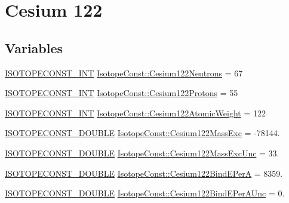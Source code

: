 \hypertarget{group___isotope_const-_cesium-_cs122}{}\section{Cesium 122}
\label{group___isotope_const-_cesium-_cs122}
\subsection*{Variables}
\begin{DoxyCompactItemize}
\item 
\mbox{\hyperlink{group___isotope_const-_macros_ga5f18360b3e99483a35c32d789e62621c}{I\+S\+O\+T\+O\+P\+E\+C\+O\+N\+S\+T\+\_\+\+I\+NT}} \mbox{\hyperlink{group___isotope_const-_cesium-_cs122_ga1a94692414f541522dfc1bc0f874b256}{Isotope\+Const\+::\+Cesium122\+Neutrons}} = 67
\item 
\mbox{\hyperlink{group___isotope_const-_macros_ga5f18360b3e99483a35c32d789e62621c}{I\+S\+O\+T\+O\+P\+E\+C\+O\+N\+S\+T\+\_\+\+I\+NT}} \mbox{\hyperlink{group___isotope_const-_cesium-_cs122_ga236af590a915b595bcb0cf8f0ecc5c2a}{Isotope\+Const\+::\+Cesium122\+Protons}} = 55
\item 
\mbox{\hyperlink{group___isotope_const-_macros_ga5f18360b3e99483a35c32d789e62621c}{I\+S\+O\+T\+O\+P\+E\+C\+O\+N\+S\+T\+\_\+\+I\+NT}} \mbox{\hyperlink{group___isotope_const-_cesium-_cs122_ga1985cb91396288ec78f41336359f64e4}{Isotope\+Const\+::\+Cesium122\+Atomic\+Weight}} = 122
\item 
\mbox{\hyperlink{group___isotope_const-_macros_ga8f45a7272ce02c0b4c65c44636ed719a}{I\+S\+O\+T\+O\+P\+E\+C\+O\+N\+S\+T\+\_\+\+D\+O\+U\+B\+LE}} \mbox{\hyperlink{group___isotope_const-_cesium-_cs122_ga7ec151e287e6fefd6c2970604e6424a3}{Isotope\+Const\+::\+Cesium122\+Mass\+Exc}} = -\/78144.
\item 
\mbox{\hyperlink{group___isotope_const-_macros_ga8f45a7272ce02c0b4c65c44636ed719a}{I\+S\+O\+T\+O\+P\+E\+C\+O\+N\+S\+T\+\_\+\+D\+O\+U\+B\+LE}} \mbox{\hyperlink{group___isotope_const-_cesium-_cs122_gaef46fcd6e9eab4fc7eb68646de25d675}{Isotope\+Const\+::\+Cesium122\+Mass\+Exc\+Unc}} = 33.
\item 
\mbox{\hyperlink{group___isotope_const-_macros_ga8f45a7272ce02c0b4c65c44636ed719a}{I\+S\+O\+T\+O\+P\+E\+C\+O\+N\+S\+T\+\_\+\+D\+O\+U\+B\+LE}} \mbox{\hyperlink{group___isotope_const-_cesium-_cs122_ga313cf3d267c8a4718ea08562ef8a934c}{Isotope\+Const\+::\+Cesium122\+Bind\+E\+PerA}} = 8359.
\item 
\mbox{\hyperlink{group___isotope_const-_macros_ga8f45a7272ce02c0b4c65c44636ed719a}{I\+S\+O\+T\+O\+P\+E\+C\+O\+N\+S\+T\+\_\+\+D\+O\+U\+B\+LE}} \mbox{\hyperlink{group___isotope_const-_cesium-_cs122_ga8bec292655c6b8372cbe5ba27a6c21cc}{Isotope\+Const\+::\+Cesium122\+Bind\+E\+Per\+A\+Unc}} = 0.

\end{DoxyCompactItemize}
